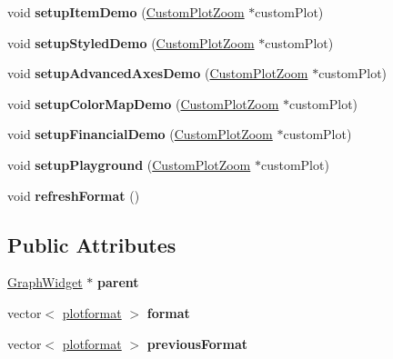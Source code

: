 \begin{DoxyCompactItemize}
void {\bfseries setup\+Item\+Demo} (\hyperlink{class_custom_plot_zoom}{Custom\+Plot\+Zoom} $\ast$custom\+Plot)
\item 
\mbox{\label{classplot_window_a850c9c888e5aef32668ae9fa4bdb47cf}} 
void {\bfseries setup\+Styled\+Demo} (\hyperlink{class_custom_plot_zoom}{Custom\+Plot\+Zoom} $\ast$custom\+Plot)
\item 
\mbox{\label{classplot_window_a01c7a27c11073cc2b4956c49a595bc90}} 
void {\bfseries setup\+Advanced\+Axes\+Demo} (\hyperlink{class_custom_plot_zoom}{Custom\+Plot\+Zoom} $\ast$custom\+Plot)
\item 
\mbox{\label{classplot_window_a7b4245e1806486e1cd1536656e706e26}} 
void {\bfseries setup\+Color\+Map\+Demo} (\hyperlink{class_custom_plot_zoom}{Custom\+Plot\+Zoom} $\ast$custom\+Plot)
\item 
\mbox{\label{classplot_window_a716be64dc447e667e29de1a40d0662d8}} 
void {\bfseries setup\+Financial\+Demo} (\hyperlink{class_custom_plot_zoom}{Custom\+Plot\+Zoom} $\ast$custom\+Plot)
\item 
\mbox{\label{classplot_window_abef8838aa313956a34abd01042b17abc}} 
void {\bfseries setup\+Playground} (\hyperlink{class_custom_plot_zoom}{Custom\+Plot\+Zoom} $\ast$custom\+Plot)
\item 
\mbox{\label{classplot_window_a7a3d455e341c673aaeff7cbb741f09fb}} 
void {\bfseries refresh\+Format} ()
\end{DoxyCompactItemize}
\subsection*{Public Attributes}
\begin{DoxyCompactItemize}
\item 
\mbox{\label{classplot_window_aa6775bd7bf9a8f72709241933136d1e0}} 
\hyperlink{class_graph_widget}{Graph\+Widget} $\ast$ {\bfseries parent}
\item 
\mbox{\label{classplot_window_a6fcb7b5377400a777ceb7b89581a5f16}} 
vector$<$ \hyperlink{structplotformat}{plotformat} $>$ {\bfseries format}
\item 
\mbox{\label{classplot_window_a9cfa52fe210ff06bea1217639da37712}} 
vector$<$ \hyperlink{structplotformat}{plotformat} $>$ {\bfseries previous\+Format}
\end{DoxyCompactItemize}


